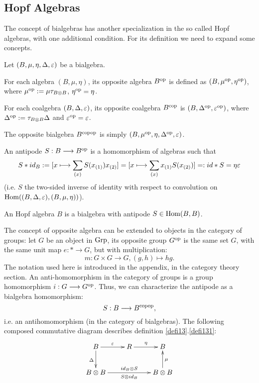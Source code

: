 \subsection{Hopf Algebras}
The concept of bialgebras has another specialization in the so called Hopf algebras, with one additional condition. For its definition we need to expand some concepts.
\begin{defi}\label{defi13}
Let $(B,\mu,\eta,\Delta,\varepsilon)$ be a bialgebra.
\bn
\item For each algebra $(B,\mu,\eta)$, its opposite algebra $B^{\mathrm{op}}$ is defined as $(B,\mu^{\mathrm{op}},\eta^{\mathrm{op}})$, where $\mu^{\mathrm{op}} := \mu \tau_{B\otimes B}$, $\eta^{\mathrm{op}} = \eta$.
\item For each coalgebra $(B,\Delta,\varepsilon)$, its opposite coalgebra $B^{\mathrm{cop}}$ is $(B,\Delta^{\mathrm{op}},\varepsilon^{\mathrm{op}})$, where $\Delta^{\mathrm{op}} := \tau_{B \otimes B} \Delta$ and $\varepsilon^{\mathrm{op}} = \varepsilon$.
\item The opposite bialgebra $B^{\mathrm{copop}}$ is simply $(B,\mu^{\mathrm{op}},\eta,\Delta^{\mathrm{op}},\varepsilon)$.
\item An antipode $S : B \longrightarrow B^{\mathrm{op}}$ is a homomorphism of algebras such that $$S * id_B := [x \longmapsto \sum_{(x)} S(x_{(1)}) x_{(2)}] = [x \longmapsto \sum_{(x)} x_{(1)} S(x_{(2)})] =: id * S = \eta \varepsilon$$
(i.e. $S$ the two-sided inverse of identity with respect to convolution on $\mathrm{Hom}((B, \Delta, \varepsilon),(B, \mu, \eta))$).
\item\label{defi131} An Hopf algebra $B$ is a bialgebra with antipode $S \in \mathrm{Hom}(B,B)$.
\en
{}
\end{defi}
The concept of opposite algebra can be extended to objects in the category of groups: let $G$ be an object in $\mathrm{Grp}$, its opposite group $G^{\mathrm{op}}$ is the same set $G$, with the same unit map $e : \ast \longrightarrow G$, but with multiplication:
$$m : G \times G \longrightarrow G, (g,h) \longmapsto h g.$$
The notation used here is introduced in the appendix, in the category theory section. An anti-homomorphism in the category of groups is a group homomorphism $i : G \longrightarrow G^{\mathrm{op}}$. Thus, we can characterize the antipode as a bialgebra homomorphism:
$$S : B \longrightarrow B^{\mathrm{copop}},$$
i.e. an antihomomorphism (in the category of bialgebras). The following composed commutative diagram describes definition \ref{defi13}.\ref{defi131}:
$$\xymatrix{
B \ar[d]_\Delta\ar[r]^\eps & R\ar[r]^\eta & B\\
B\otimes B\ar[rr]^{id_B \otimes S}_{S \otimes id_B} &&B\otimes B\ar[u]_\mu\\
}$$
